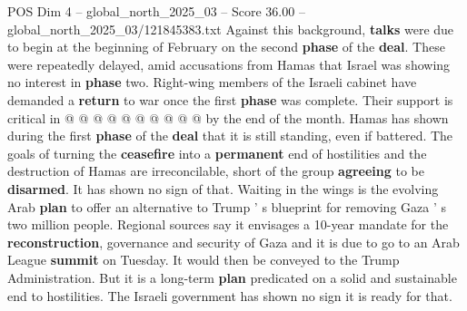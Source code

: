 \begin{textsample}{POS Dim 4 – global\_north\_2025\_03 – Score 36.00 – global\_north\_2025\_03/121845383.txt}
Against this background, \textbf{talks} were due to begin at the beginning of February on the second \textbf{phase} of the \textbf{deal}.
These were repeatedly delayed, amid accusations from Hamas that Israel was showing no interest in \textbf{phase} two.
Right-wing members of the Israeli cabinet have demanded a \textbf{return} to war once the first \textbf{phase} was complete.
Their support is critical in @ @ @ @ @ @ @ @ @ @ by the end of the month.
Hamas has shown during the first \textbf{phase} of the \textbf{deal} that it is still standing, even if battered.
The goals of turning the \textbf{ceasefire} into a \textbf{permanent} end of hostilities and the destruction of Hamas are irreconcilable, short of the group \textbf{agreeing} to be \textbf{disarmed}.
It has shown no sign of that.
Waiting in the wings is the evolving Arab \textbf{plan} to offer an alternative to Trump ' s blueprint for removing Gaza ' s two million people.
Regional sources say it envisages a 10-year mandate for the \textbf{reconstruction}, governance and security of Gaza and it is due to go to an Arab League \textbf{summit} on Tuesday.
It would then be conveyed to the Trump Administration.
But it is a long-term \textbf{plan} predicated on a solid and sustainable end to hostilities.
The Israeli government has shown no sign it is ready for that.

\end{textsample}
